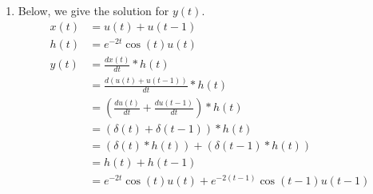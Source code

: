 \documentclass[10pt,a4paper, margin=1in]{article}
\begin{document}
\begin{enumerate}
\begin{enumerate}
    \item Below, we give the solution for $y(t)$.
    	\begin{equation}
	\begin{split}
		x(t) & = u(t) + u(t - 1)\\
		h(t) & = e^{-2t}\cos(t)u(t)\\
		y(t) & = \frac{dx(t)}{dt} \ast h(t)\\
		& = \frac{d(u(t) + u(t - 1))}{dt} \ast h(t)\\
		& = \left( \frac{du(t)}{dt} + \frac{du(t - 1)}{dt} \right) \ast h(t)\\
		& = \left( \delta(t) + \delta(t - 1) \right) \ast h(t)\\
		& = \left( \delta(t) \ast h(t) \right) + \left( \delta(t - 1) \ast h(t) \right)\\
		& = h(t) + h(t - 1)\\
		& = e^{-2t}\cos(t)u(t) + e^{-2(t - 1)}\cos(t - 1)u(t - 1)
	\end{split}
	\end{equation}
    
    
    \end{enumerate}


\end{enumerate}
\end{document}
